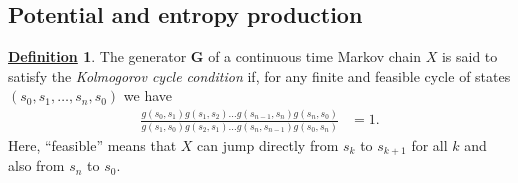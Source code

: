 \documentclass[12pt]{book}
\numberwithin{equation}{chapter}
\theoremstyle{plain}
\numberwithin{theorem}{section}
\theoremstyle{definition}
\newtheorem{definition}[theorem]{\underline{Definition}}
\numberwithin{exercise}{chapter}
\newcommand{\<}{\langle}
\renewcommand{\>}{\rangle}
\renewcommand{\(}{\left(}
\renewcommand{\)}{\right)}
\renewcommand{\[}{\left[}
\renewcommand{\]}{\right]}
\newcommand\Pb{\mathds{P}}
\newcommand\Gv{\pmb{G}}
\newcommand\Pv{\pmb{P}}
\newcommand\ee{\mathrm{e}}
\newcommand{\blu}[1]{\textcolor{blue}{#1}}
\begin{document}


\subsection{Potential and entropy production}

\begin{definition}
\label{def:cycle}
The generator $\Gv$ of a continuous time Markov chain $X$ is said to satisfy the \textit{Kolmogorov cycle condition} if, for any finite and feasible cycle of states $(s_0, s_1, \ldots, s_n, s_0)$ we have
\begin{align}
\frac{g(s_0, s_1)g(s_1, s_2) \ldots g(s_{n-1}, s_n)g(s_n, s_0)}	{g(s_1, s_0)g(s_2, s_1) \ldots g(s_n, s_{n-1})g(s_0, s_n)}
	&= 1. \label{eq:kcc}
\end{align}
Here, ``feasible'' means that $X$ can jump directly from $s_{k}$ to $s_{k+1}$ for all $k$ and also from $s_n$ to $s_0$.
\end{definition}
\end{document}
